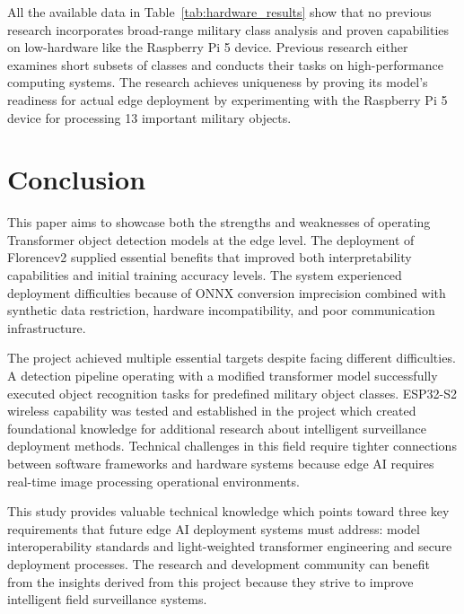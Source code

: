 \documentclass[fleqn,10pt,lineno]{wlpeerj}
\begin{document}
All the available data in Table~\ref{tab:hardware_results} show that no previous research incorporates broad-range military class analysis and proven capabilities on low-hardware like the Raspberry Pi 5 device. Previous research either examines short subsets of classes and conducts their tasks on high-performance computing systems. The research achieves uniqueness by proving its model's readiness for actual edge deployment by experimenting with the Raspberry Pi 5 device for processing 13 important military objects.

\section{Conclusion}
This paper aims to showcase both the strengths and weaknesses of operating Transformer object detection models at the edge level. The deployment of Florencev2 supplied essential benefits that improved both interpretability capabilities and initial training accuracy levels. The system experienced deployment difficulties because of ONNX conversion imprecision combined with synthetic data restriction, hardware incompatibility, and poor communication infrastructure. 

The project achieved multiple essential targets despite facing different difficulties. A detection pipeline operating with a modified transformer model successfully executed object recognition tasks for predefined military object classes. ESP32-S2 wireless capability was tested and established in the project which created foundational knowledge for additional research about intelligent surveillance deployment methods. Technical challenges in this field require tighter connections between software frameworks and hardware systems because edge AI requires real-time image processing operational environments. 

This study provides valuable technical knowledge which points toward three key requirements that future edge AI deployment systems must address: model interoperability standards and light-weighted transformer engineering and secure deployment processes. The research and development community can benefit from the insights derived from this project because they strive to improve intelligent field surveillance systems.  
\end{document}
